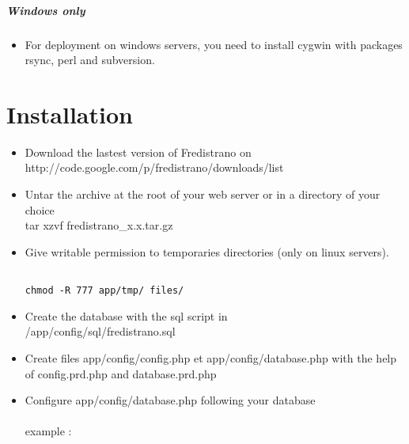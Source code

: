 \documentclass[12pt,a4paper]{report}
\begin{document}
\paragraph*{Windows only}
\begin{itemize}
\item
For deployment on windows servers, you need to install cygwin with packages rsync, perl and subversion.

\end{itemize}

\chapter{Installation}
\begin{itemize}
\item Download the lastest version of Fredistrano on\\ http://code.google.com/p/fredistrano/downloads/list
\item Untar the archive at the root of your web server or in a directory of your choice \: \\
tar xzvf fredistrano\_x.x.tar.gz \\
\item Give writable permission to temporaries directories (only on linux servers).\\
\begin{verbatim}

chmod -R 777 app/tmp/ files/

\end{verbatim}

\item Create the database with the sql script in\\ /app/config/sql/fredistrano.sql\\
\item Create files app/config/config.php et app/config/database.php with the help of config.prd.php and database.prd.php\newpage

\item Configure app/config/database.php following your database\\\\example :\\

\lstset{language=Php}
\lstset{commentstyle=\textit}


\end{itemize}
\end{document}
